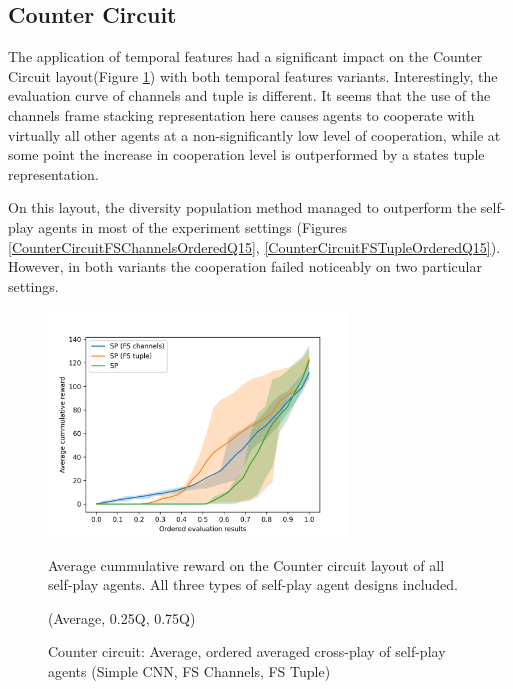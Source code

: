 \newpage

\subsection{Counter Circuit}
The application of temporal features had a significant impact on the Counter Circuit layout(Figure \ref{CounterCircuitFSVariantsOrderedAvg}) with both temporal features variants.
Interestingly, the evaluation curve of channels and tuple is different. 
It seems that the use of the channels frame stacking representation here causes agents to cooperate with virtually all other agents at a non-significantly low level of cooperation, while at some point the increase in cooperation level is outperformed by a states tuple representation.

On this layout, the diversity population method managed to outperform the self-play agents in most of the experiment settings (Figures \ref {CounterCircuitFSChannelsOrderedQ15}, \ref {CounterCircuitFSTupleOrderedQ15}).
However, in both variants the cooperation failed noticeably on two particular settings. 


\begin{figure}[!ht]
    \centering
    \includegraphics*[width=8cm]{../img/CounterCircuitFSVariantsOrderedAvg.png}

    \caption{Counter circuit: Average, ordered averaged cross-play of self-play agents (Simple CNN, FS Channels, FS Tuple)}
    \label{CounterCircuitFSVariantsOrderedAvg}
    \medskip
    \small 
    Average cummulative reward on the Counter circuit layout of all self-play agents.
    All three types of self-play agent designs included.

    (Average, 0.25Q, 0.75Q)

\end{figure}


